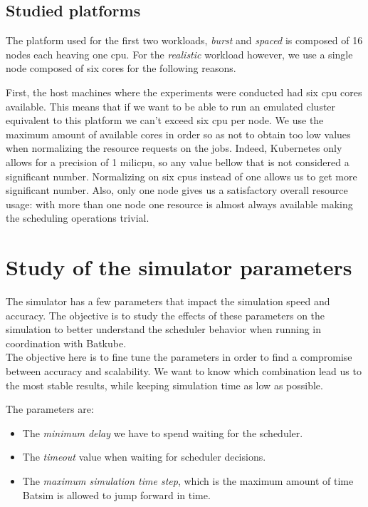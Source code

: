 \subsection{Studied platforms}

The platform used for the first two workloads, \textit{burst} and
\textit{spaced} is composed of 16 nodes each heaving one cpu. For the
\textit{realistic} workload however, we use a single node composed of six cores
for the following reasons.

First, the host machines where the experiments were conducted had six cpu cores
available. This means that if we want to be able to run an emulated cluster
equivalent to this platform we can't exceed six cpu per node.  We use the
maximum amount of available cores in order so as not to obtain too low values
when normalizing the resource requests on the jobs. Indeed, Kubernetes only
allows for a precision of 1 milicpu, so any value bellow that is not considered
a significant number. Normalizing on six cpus instead of one allows us to get
more significant number. Also, only one node gives us a satisfactory overall
resource usage: with more than one node one resource is almost always available
making the scheduling operations trivial.

\section{Study of the simulator parameters}

The simulator has a few parameters that impact the simulation speed and
accuracy. The objective is to study the effects of these parameters on the
simulation to better understand the scheduler behavior when running in
coordination with Batkube.\\

The objective here is to fine tune the parameters in order to find a compromise
between accuracy and scalability. We want to know which combination lead us to
the most stable results, while keeping simulation time as low as possible.

The parameters are:
\begin{itemize}
	\item The \textit{minimum delay} we have to spend waiting for the
		scheduler.
	\item The \textit{timeout} value when waiting for scheduler decisions.
	\item The \textit{maximum simulation time step}, which is the maximum
		amount of time Batsim is allowed to jump forward in time.
\end{itemize}

